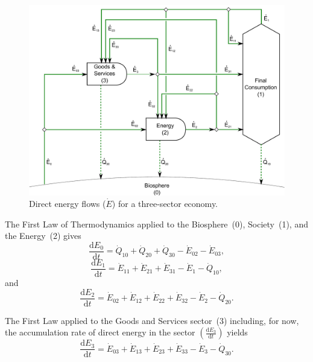\begin{landscape}
\begin{figure}[!ht]
\centering
\includegraphics[width=0.8\linewidth]{Part_1/Chapter_Energy/images/3_sector_direct_energy.pdf}
\caption[Direct energy flows for a three-sector economy]{Direct energy flows ($\dot{E}$) for a three-sector economy.}
\label{fig:C_energy}
\end{figure}
\end{landscape}

The First Law of Thermodynamics applied to the 
Biosphere~(0), Society~(1), and the Energy~(2) gives
%
\begin{equation} \label{eq:C-CV_E_dot_0}
	\frac{\mathrm{d}E_{0}}{\mathrm{d}t} 	 
	= \dot{Q}_{10} 
	+ \dot{Q}_{20} 
	+ \dot{Q}_{30} 
	- \dot{E}_{02} 
	- \dot{E}_{03},
\end{equation}
%
\begin{equation} \label{eq:C-CV_E_dot_1}
	\frac{\mathrm{d}E_{1}}{\mathrm{d}t}
	= \dot{E}_{11}
	+ \dot{E}_{21}  
	+ \dot{E}_{31} 
	- \dot{E}_{1}
	- \dot{Q}_{10},
\end{equation}
%
and 
%
\begin{equation} \label{eq:C-CV_E_dot_2}
	\frac{\mathrm{d}E_{2}}{\mathrm{d}t} 	 
	= \dot{E}_{02} 
	+ \dot{E}_{12}
	+ \dot{E}_{22} 
	+ \dot{E}_{32} 
	- \dot{E}_{2} 
	- \dot{Q}_{20}.
\end{equation}

The First Law applied to the Goods and Services sector~(3) including, 
for now, the accumulation rate of direct energy in the sector 
$\left(\frac{\mathrm{d}E_{3}}{\mathrm{d}t}\right)$ yields
%
\begin{equation} \label{eq:C-CV_E_dot_3}
	\frac{\mathrm{d}E_{3}}{\mathrm{d}t} 
	= \dot{E}_{03} 
	+ \dot{E}_{13}
	+ \dot{E}_{23} 
	+ \dot{E}_{33} 
	- \dot{E}_3 
	- \dot{Q}_{30}.
\end{equation}

